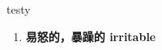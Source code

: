 
\begin{frame}
{\huge testy}
\begin{center}
\begin{enumerate}\Large
  \item \textbf{易怒的，暴躁的 irritable}
\end{enumerate}
\end{center}
\end{frame}
